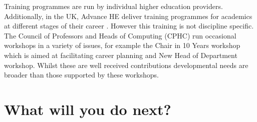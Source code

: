 \documentclass[sigconf]{acmart}
\begin{document}
Training programmes are run by individual higher education providers. Additionally, in the UK, Advance HE deliver training programmes for academics at different stages of their career \cite{HEATraining}. However this training is not discipline specific. The Council of Professors and Heads of Computing (CPHC) run occasional workshops in a variety of issues, for example the Chair in 10 Years workshop which is aimed at facilitating career planning and New Head of Department workshop. Whilst these are well received contributions developmental needs are broader than those supported by these workshops. 


\section{What will you do next?}
\begin{comment}

Scaling up


Funding 


Shared CPD learning materials


Address EDI issues in computer science


Reverse mentoring


Align with BCS


Special interest group

Web space for repository and functionality (mentoring, buddying) to store CPD sessions, shared resources for new CS academics, examples of good practice and a discussion space.

Explore what BCS are doing with professionals in non academic roles

Encourage research on pedagogy and educational issues in CS

Examine if programme framework is transferrable to other disciplines
\end{comment}
\end{document}
